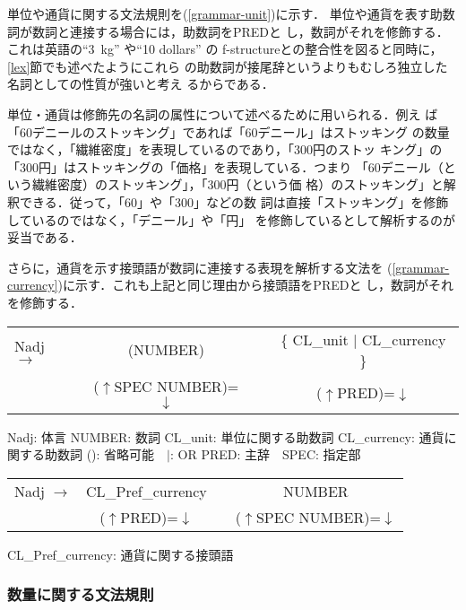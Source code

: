 \documentclass[japanese]{jnlp_1.4}
\begin{document}
単位や通貨に関する文法規則を(\ref{grammar-unit})に示す．
単位や通貨を表す助数詞が数詞と連接する場合には，助数詞をPREDと
し，数詞がそれを修飾する．これは英語の``3~kg'' や``10 dollars'' の
f-structureとの整合性を図ると同時に，\ref{lex}節でも述べたようにこれら
の助数詞が接尾辞というよりもむしろ独立した名詞としての性質が強いと考え
るからである．

単位・通貨は修飾先の名詞の属性について述べるために用いられる．例え
ば「60デニールのストッキング」であれば「60デニール」はストッキング
の数量ではなく，「繊維密度」を表現しているのであり，「300円のストッ
キング」の「300円」はストッキングの「価格」を表現している．つまり
「60デニール（という繊維密度）のストッキング」，「300円（という価
格）のストッキング」と解釈できる．従って，「60」や「300」などの数
詞は直接「ストッキング」を修飾しているのではなく，「デニール」や「円」
を修飾しているとして解析するのが妥当である．

さらに，通貨を示す接頭語が数詞に連接する表現を解析する文法を
(\ref{grammar-currency})に示す．これも上記と同じ理由から接頭語をPREDと
し，数詞がそれを修飾する．

\begin{example}
\label{grammar-unit}
\begin{tabular}[t]{lccc}
Nadj $\longrightarrow$ & (NUMBER) && \{ CL\_unit $|$ CL\_currency \} \\
&($\uparrow$SPEC NUMBER)=$\downarrow$ \hspace*{.3cm} &&($\uparrow$PRED)=$\downarrow$\\[2ex]
\end{tabular}

Nadj: 体言 \quad NUMBER: 数詞 \quad CL\_unit: 単位に関する助数詞 \quad CL\_currency: 通貨に関する助数詞 (): 省略可能　$|$: OR PRED: 主辞　SPEC: 指定部
\end{example}

\begin{example}
\label{grammar-currency}
\begin{tabular}[t]{lccc}
Nadj $\longrightarrow$&CL\_Pref\_currency &&NUMBER\\
&($\uparrow$PRED)=$\downarrow$&& ($\uparrow$SPEC NUMBER)=$\downarrow$\\[2ex]
\end{tabular}

CL\_Pref\_currency: 通貨に関する接頭語
\end{example}


\subsubsection{数量に関する文法規則}
\end{document}
